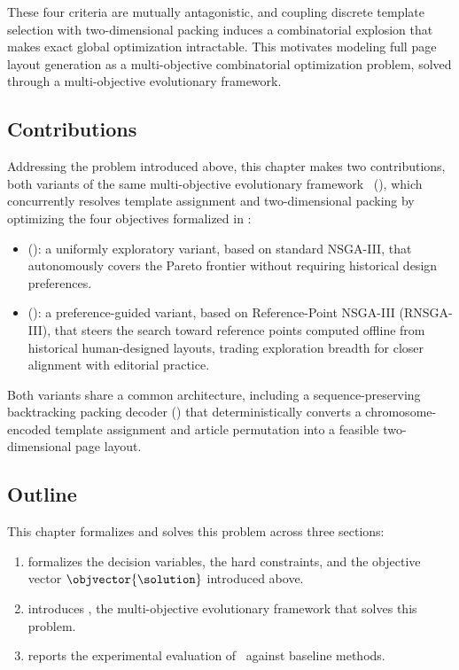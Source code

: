 These four criteria are mutually antagonistic, and coupling discrete template selection with two-dimensional packing induces a combinatorial explosion that makes exact global optimization intractable. This motivates modeling full page layout generation as a multi-objective combinatorial optimization problem, solved through a multi-objective evolutionary framework.

\subsection{Contributions}

Addressing the problem introduced above, this chapter makes two contributions, both variants of the same multi-objective evolutionary framework \methodNameGeneral\ (), which concurrently resolves template assignment and two-dimensional packing by optimizing the four  objectives formalized in :
\begin{itemize}
    \item \textbf{\methodNameUniform} (): a uniformly exploratory variant, based on standard NSGA-III, that autonomously covers the Pareto frontier without requiring historical design preferences.
    \item \textbf{\methodName} (): a preference-guided variant, based on Reference-Point NSGA-III (RNSGA-III), that steers the search toward reference points computed offline from historical human-designed layouts, trading exploration breadth for closer alignment with editorial practice.
\end{itemize}
Both variants share a common architecture, including a sequence-preserving backtracking packing decoder () that deterministically converts a chromosome-encoded template assignment and article permutation into a feasible two-dimensional page layout.

\subsection*{Outline}

This chapter formalizes and solves this problem across three sections:
\begin{enumerate}
    \item {} formalizes the decision variables, the hard constraints, and the objective vector $\objvector{\solution}$ introduced above.
    \item {} introduces \methodNameGeneral, the multi-objective evolutionary framework that solves this problem.
    \item {} reports the experimental evaluation of \methodNameGeneral\ against baseline methods.
\end{enumerate}

